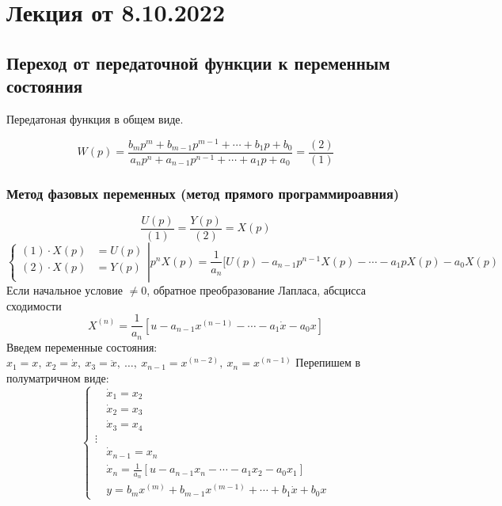 \section{Лекция от 8.10.2022}
\subsection{Переход от передаточной функции к переменным состояния}
Передатоная функция в общем виде.\par
\[
  W(p) = \frac{b_mp^{m} + b_{m-1}p^{m-1} + \cdots + b_1p + b_0}{a_np^{n} +
  a_{n-1}p^{n-1} + \cdots + a_1p + a_0} = \frac{(2)}{(1)}
\]
\subsubsection{Метод фазовых переменных (метод прямого программироавния)}
\[
  \frac{U(p)}{(1)} = \frac{Y(p)}{(2)} = X(p)
\] 
\[
  \left.\left\{\begin{aligned} 
    (1) \cdot  X(p) &= U(p)\\
    (2) \cdot  X(p) &= Y(p)\\
  \end{aligned}\right. \right| 
  p^n X(p) = \frac{1}{a_n}[U(p)-a_{n-1}p^{n-1}X(p) - \cdots - a_1pX(p)-a_0X(p)
\] 
{\ttfamily Если начальное условие $\neq 0$, обратное преобразование Лапласа,
абсцисса сходимости}
\[
  X^{(n)} = \frac{1}{a_n}[u - a_{n-1}x^{(n-1)} - \cdots - a_1 \dot x - a_0 x]
\] 
Введем переменные состояния: $x_1 = x,\ x_2 = \dot x,\ x_3 = \ddot x,\ \ldots,\ 
x_{n-1} = x^{(n-2)},\ x_n = x^{(n-1)}$
Перепишем в полуматричном виде:
\[
  \left\{\begin{aligned}
    &\dot x_1 = x_2 \\ &\dot x_2 = x_3 \\ &\dot x_3 = x_4 \\ \vdots \\ 
    &\dot x_{n-1} = x_n \\ &\dot x_n = \frac{1}{a_n}[u - a_{n-1}x_n -
    \cdots - a_1 x_2 - a_0 x_1] \\
    &y = b_mx^{(m)} + b_{m-1}x^{(m-1)} + \cdots + b_1 \dot x + b_0 x
  \end{aligned}\right. 
\] 

